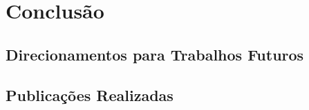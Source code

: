 \chapter{Conclusão}
\label{c.conclusao}

\section{Direcionamentos para Trabalhos Futuros}
\label{s.future_work}

\section{Publicações Realizadas}
\label{s.publication}